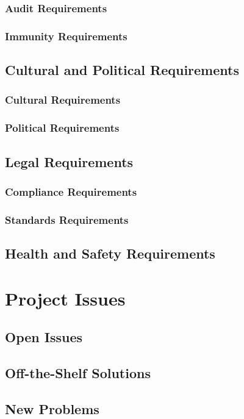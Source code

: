 \documentclass{article}
\begin{document}
    \subsubsection{Audit Requirements}
    \subsubsection{Immunity Requirements}
    
\subsection{Cultural and Political Requirements}
    \subsubsection{Cultural Requirements}
    \subsubsection{Political Requirements}    
    
\subsection{Legal Requirements}
    \subsubsection{Compliance Requirements}
    \subsubsection{Standards Requirements}    
\subsection{Health and Safety Requirements}

\section{Project Issues}
\subsection{Open Issues}
\subsection{Off-the-Shelf Solutions}
\subsection{New Problems}
\end{document}

